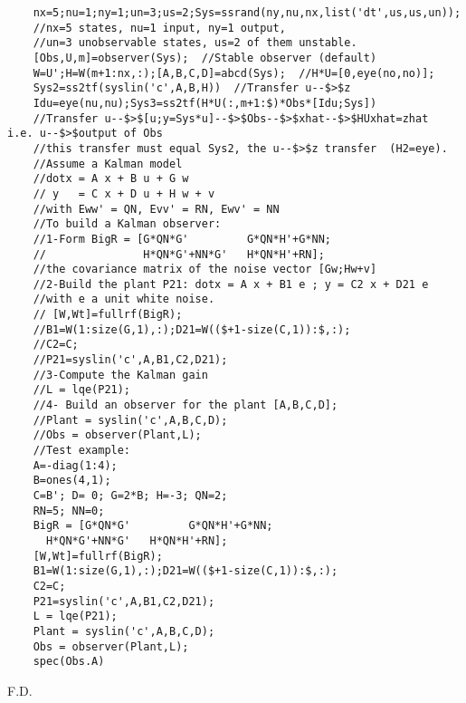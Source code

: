 \begin{examples}
  \begin{Verbatim}
    nx=5;nu=1;ny=1;un=3;us=2;Sys=ssrand(ny,nu,nx,list('dt',us,us,un));
    //nx=5 states, nu=1 input, ny=1 output, 
    //un=3 unobservable states, us=2 of them unstable.
    [Obs,U,m]=observer(Sys);  //Stable observer (default)
    W=U';H=W(m+1:nx,:);[A,B,C,D]=abcd(Sys);  //H*U=[0,eye(no,no)];
    Sys2=ss2tf(syslin('c',A,B,H))  //Transfer u--$>$z
    Idu=eye(nu,nu);Sys3=ss2tf(H*U(:,m+1:$)*Obs*[Idu;Sys])  
    //Transfer u--$>$[u;y=Sys*u]--$>$Obs--$>$xhat--$>$HUxhat=zhat  i.e. u--$>$output of Obs
    //this transfer must equal Sys2, the u--$>$z transfer  (H2=eye).
    //Assume a Kalman model
    //dotx = A x + B u + G w
    // y   = C x + D u + H w + v
    //with Eww' = QN, Evv' = RN, Ewv' = NN
    //To build a Kalman observer:
    //1-Form BigR = [G*QN*G'         G*QN*H'+G*NN;
    //               H*QN*G'+NN*G'   H*QN*H'+RN];
    //the covariance matrix of the noise vector [Gw;Hw+v]
    //2-Build the plant P21: dotx = A x + B1 e ; y = C2 x + D21 e 
    //with e a unit white noise.
    // [W,Wt]=fullrf(BigR);
    //B1=W(1:size(G,1),:);D21=W(($+1-size(C,1)):$,:);
    //C2=C;
    //P21=syslin('c',A,B1,C2,D21);
    //3-Compute the Kalman gain
    //L = lqe(P21);
    //4- Build an observer for the plant [A,B,C,D];
    //Plant = syslin('c',A,B,C,D);
    //Obs = observer(Plant,L);
    //Test example:
    A=-diag(1:4);
    B=ones(4,1);
    C=B'; D= 0; G=2*B; H=-3; QN=2;
    RN=5; NN=0;
    BigR = [G*QN*G'         G*QN*H'+G*NN;
      H*QN*G'+NN*G'   H*QN*H'+RN];
    [W,Wt]=fullrf(BigR);
    B1=W(1:size(G,1),:);D21=W(($+1-size(C,1)):$,:);
    C2=C;
    P21=syslin('c',A,B1,C2,D21);
    L = lqe(P21);
    Plant = syslin('c',A,B,C,D);
    Obs = observer(Plant,L);
    spec(Obs.A)
  \end{Verbatim}
\end{examples}
\begin{manseealso}
      
\end{manseealso}
\begin{authors}
  F.D.  
\end{authors}
